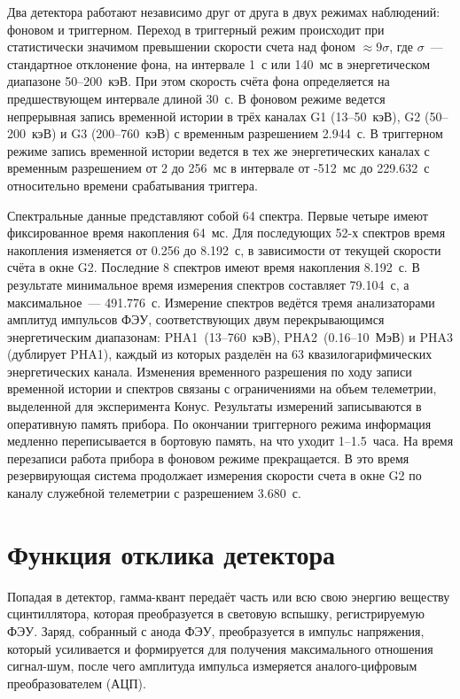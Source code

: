 Два детектора работают независимо друг от друга в двух режимах наблюдений: 
фоновом и триггерном. Переход в триггерный режим происходит при статистически 
значимом превышении скорости счета над фоном $\approx 9\sigma$\footnotemark, 
где $\sigma$~--- стандартное отклонение фона, на интервале 1~с или 140~мс 
в энергетическом диапазоне 50--200~кэВ. При этом скорость счёта фона 
определяется на предшествующем интервале длиной 30~с. В фоновом режиме ведется 
непрерывная запись временной истории в трёх каналах G1 (13--50~кэВ), G2 (50--200~кэВ) 
и G3 (200--760~кэВ) с временным разрешением 2.944~с. В триггерном режиме запись 
временной истории ведется в тех же энергетических каналах с временным разрешением 
от 2 до 256~мс в интервале от -512~мс до 229.632~с относительно времени срабатывания 
триггера.


Спектральные данные представляют собой 64 спектра. Первые четыре имеют фиксированное время накопления 64~мс.
Для последующих 52-х спектров время накопления изменяется от 0.256 до 8.192~с, 
в зависимости от текущей скорости счёта в окне G2. Последние 8 спектров имеют время накопления 8.192~с. 
В результате минимальное время измерения спектров составляет 79.104~с, а максимальное~--- 491.776~с.
Измерение спектров ведётся тремя анализаторами амплитуд импульсов ФЭУ, соответствующих
двум перекрывающимся энергетическим диапазонам:  
PHA1~(13--760~кэВ), PHA2~(0.16--10~МэВ) и PHA3 (дублирует PHA1), каждый из которых 
разделён на 63 квазилогарифмических энергетических канала. 
Изменения временного разрешения по ходу записи временной истории и спектров связаны с ограничениями на объем телеметрии, 
выделенной для эксперимента Конус. Результаты измерений записываются в оперативную 
память прибора. По окончании триггерного режима информация медленно переписывается 
в бортовую память, на что уходит 1--1.5~часа. На время перезаписи работа прибора 
в фоновом режиме прекращается. В это время резервирующая система продолжает измерения
скорости счета в окне G2 по каналу служебной телеметрии с разрешением 3.680~с.

\section{Функция отклика детектора}
Попадая в детектор, гамма-квант передаёт часть или всю свою энергию веществу 
сцинтиллятора, которая преобразуется в световую вспышку, регистрируемую ФЭУ. 
Заряд, собранный с анода ФЭУ, преобразуется в импульс напряжения, который усиливается и формируется для получения 
максимального отношения сигнал-шум, после чего амплитуда импульса измеряется 
аналого-цифровым преобразователем (АЦП). 

